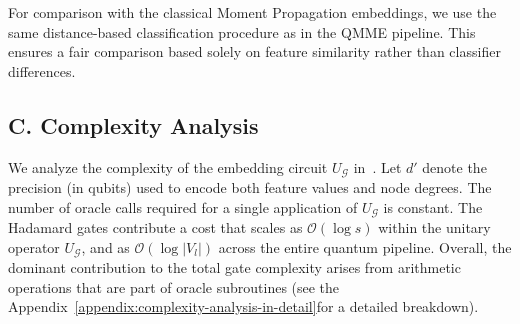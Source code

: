 \documentclass[
  reprint,
  superscriptaddress,
  amsmath,amssymb,
  aps,prl,
]{revtex4-2}
\begin{document}
%
For comparison with the classical Moment Propagation embeddings, we use the same distance-based classification procedure as in the QMME pipeline. This ensures a fair comparison based solely on feature similarity rather than classifier differences.
%
\subsection{C. Complexity Analysis}
\label{sec:complexity}
%
\noindent We analyze the complexity of the embedding circuit \(U_\mathcal G\) in~. 
Let \( d' \) denote the precision (in qubits) used to encode both feature values and node degrees. 
The number of oracle calls required for a single application of \(U_\mathcal G\) is constant. 
The Hadamard gates contribute a cost that scales as \(\mathcal{O}(\log s)\) within the unitary operator \(U_\mathcal G\), and as \(\mathcal{O}(\log |V_l|)\) across the entire quantum pipeline. 
Overall, the dominant contribution to the total gate complexity arises from arithmetic operations that are part of oracle subroutines (see the Appendix~\ref{appendix:complexity-analysis-in-detail}for a detailed breakdown).
%
%
\end{document}
